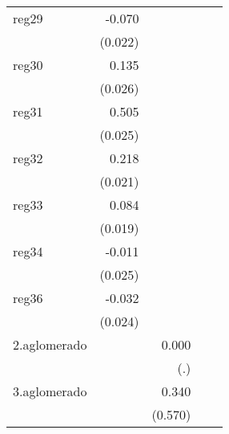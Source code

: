 {\begin{longtable}{l*{4}{D{.}{.}{-1}}}
\addlinespace
reg29       &      -0.070\sym{**} &                     &                     &                     \\
            &     (0.022)         &                     &                     &                     \\
\addlinespace
reg30       &       0.135\sym{***}&                     &                     &                     \\
            &     (0.026)         &                     &                     &                     \\
\addlinespace
reg31       &       0.505\sym{***}&                     &                     &                     \\
            &     (0.025)         &                     &                     &                     \\
\addlinespace
reg32       &       0.218\sym{***}&                     &                     &                     \\
            &     (0.021)         &                     &                     &                     \\
\addlinespace
reg33       &       0.084\sym{***}&                     &                     &                     \\
            &     (0.019)         &                     &                     &                     \\
\addlinespace
reg34       &      -0.011         &                     &                     &                     \\
            &     (0.025)         &                     &                     &                     \\
\addlinespace
reg36       &      -0.032         &                     &                     &                     \\
            &     (0.024)         &                     &                     &                     \\
\addlinespace
2.aglomerado&                     &       0.000         &                     &                     \\
            &                     &         (.)         &                     &                     \\
\addlinespace
3.aglomerado&                     &       0.340         &                     &                     \\
            &                     &     (0.570)         &                     &                     \\

\end{longtable}}
